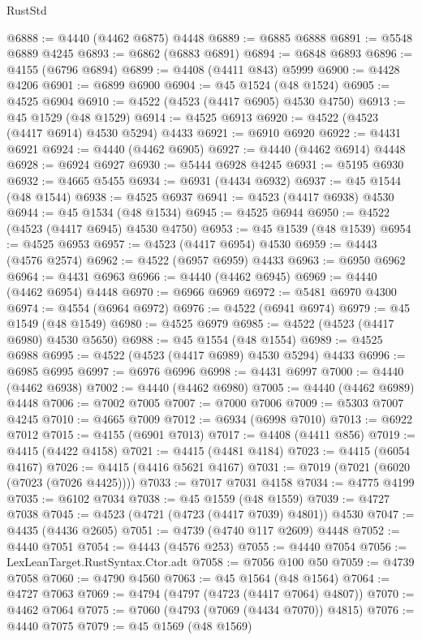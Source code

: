 \begin{lexlean}{RustStd}
\begin{coremodule}
@6888 := @4440 (@4462 @6875) @4448
@6889 := @6885 @6888
@6891 := @5548 @6889 @4245
@6893 := @6862 (@6883 @6891)
@6894 := @6848 @6893
@6896 := @4155 (@6796 @6894)
@6899 := @4408 (@4411 @843) @5999
@6900 := @4428 @4206
@6901 := @6899 @6900
@6904 := @45 @1524 (@48 @1524)
@6905 := @4525 @6904
@6910 := @4522 (@4523 (@4417 @6905) @4530 @4750)
@6913 := @45 @1529 (@48 @1529)
@6914 := @4525 @6913
@6920 := @4522 (@4523 (@4417 @6914) @4530 @5294) @4433
@6921 := @6910 @6920
@6922 := @4431 @6921
@6924 := @4440 (@4462 @6905)
@6927 := @4440 (@4462 @6914) @4448
@6928 := @6924 @6927
@6930 := @5444 @6928 @4245
@6931 := @5195 @6930
@6932 := @4665 @5455
@6934 := @6931 (@4434 @6932)
@6937 := @45 @1544 (@48 @1544)
@6938 := @4525 @6937
@6941 := @4523 (@4417 @6938) @4530
@6944 := @45 @1534 (@48 @1534)
@6945 := @4525 @6944
@6950 := @4522 (@4523 (@4417 @6945) @4530 @4750)
@6953 := @45 @1539 (@48 @1539)
@6954 := @4525 @6953
@6957 := @4523 (@4417 @6954) @4530
@6959 := @4443 (@4576 @2574)
@6962 := @4522 (@6957 @6959) @4433
@6963 := @6950 @6962
@6964 := @4431 @6963
@6966 := @4440 (@4462 @6945)
@6969 := @4440 (@4462 @6954) @4448
@6970 := @6966 @6969
@6972 := @5481 @6970 @4300
@6974 := @4554 (@6964 @6972)
@6976 := @4522 (@6941 @6974)
@6979 := @45 @1549 (@48 @1549)
@6980 := @4525 @6979
@6985 := @4522 (@4523 (@4417 @6980) @4530 @5650)
@6988 := @45 @1554 (@48 @1554)
@6989 := @4525 @6988
@6995 := @4522 (@4523 (@4417 @6989) @4530 @5294) @4433
@6996 := @6985 @6995
@6997 := @6976 @6996
@6998 := @4431 @6997
@7000 := @4440 (@4462 @6938)
@7002 := @4440 (@4462 @6980)
@7005 := @4440 (@4462 @6989) @4448
@7006 := @7002 @7005
@7007 := @7000 @7006
@7009 := @5303 @7007 @4245
@7010 := @4665 @7009
@7012 := @6934 (@6998 @7010)
@7013 := @6922 @7012
@7015 := @4155 (@6901 @7013)
@7017 := @4408 (@4411 @856)
@7019 := @4415 (@4422 @4158)
@7021 := @4415 (@4481 @4184)
@7023 := @4415 (@6054 @4167)
@7026 := @4415 (@4416 @5621 @4167)
@7031 := @7019 (@7021 (@6020 (@7023 (@7026 @4425))))
@7033 := @7017 @7031 @4158
@7034 := @4775 @4199
@7035 := @6102 @7034
@7038 := @45 @1559 (@48 @1559)
@7039 := @4727 @7038
@7045 := @4523 (@4721 (@4723 (@4417 @7039) @4801)) @4530
@7047 := @4435 (@4436 @2605)
@7051 := @4739 (@4740 @117 @2609) @4448
@7052 := @4440 @7051
@7054 := @4443 (@4576 @253)
@7055 := @4440 @7054
@7056 := LexLeanTarget.RustSyntax.Ctor.adt
@7058 := @7056 @100 @50
@7059 := @4739 @7058
@7060 := @4790 @4560
@7063 := @45 @1564 (@48 @1564)
@7064 := @4727 @7063
@7069 := @4794 (@4797 (@4723 (@4417 @7064) @4807))
@7070 := @4462 @7064
@7075 := @7060 (@4793 (@7069 (@4434 @7070)) @4815)
@7076 := @4440 @7075
@7079 := @45 @1569 (@48 @1569)

\end{coremodule}
\end{lexlean}
